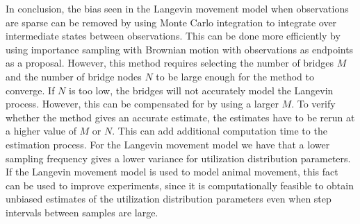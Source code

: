

In conclusion, the bias seen in the Langevin movement model when observations are sparse can be removed by using Monte Carlo integration to integrate over intermediate states between observations. This can be done more efficiently by using importance sampling with Brownian motion with observations as endpoints as a proposal. However, this method requires selecting the number of bridges $M$ and the number of bridge nodes $N$ to be large enough for the method to converge. If $N$ is too low, the bridges will not accurately model the Langevin process. However, this can be compensated for by using a larger $M$. To verify whether the method gives an accurate estimate, the estimates have to be rerun at a higher value of $M$ or $N$. This can add additional computation time to the estimation process. For the Langevin movement model we have that a lower sampling frequency gives a lower variance for utilization distribution parameters. If the Langevin movement model is used to model animal movement, this fact can be used to improve experiments, since it is computationally feasible to obtain unbiased estimates of the utilization distribution parameters even when step intervals between samples are large.








 